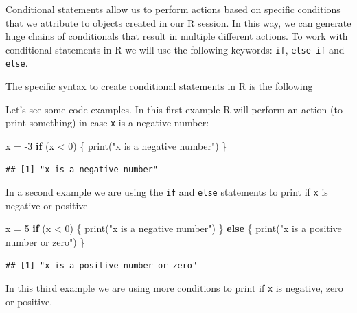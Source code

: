 \documentclass[
]{book}
\newenvironment{Shaded}{\begin{snugshade}}{\end{snugshade}}
\newcommand{\ControlFlowTok}[1]{\textcolor[rgb]{0.13,0.29,0.53}{\textbf{#1}}}
\newcommand{\DecValTok}[1]{\textcolor[rgb]{0.00,0.00,0.81}{#1}}
\newcommand{\FunctionTok}[1]{\textcolor[rgb]{0.00,0.00,0.00}{#1}}
\newcommand{\NormalTok}[1]{#1}
\newcommand{\OtherTok}[1]{\textcolor[rgb]{0.56,0.35,0.01}{#1}}
\newcommand{\SpecialCharTok}[1]{\textcolor[rgb]{0.00,0.00,0.00}{#1}}
\newcommand{\StringTok}[1]{\textcolor[rgb]{0.31,0.60,0.02}{#1}}
\theoremstyle{definition}
\theoremstyle{definition}
\theoremstyle{definition}
\theoremstyle{definition}
\theoremstyle{remark}
\begin{document}
Conditional statements allow us to perform actions based on specific conditions that we attribute to objects created in our R session. In this way, we can generate huge chains of conditionals that result in multiple different actions. To work with conditional statements in R we will use the following keywords: \texttt{if}, \texttt{else\ if} and \texttt{else}.

The specific syntax to create conditional statements in R is the following

Let's see some code examples. In this first example R will perform an action (to print something) in case \texttt{x} is a negative number:

\begin{Shaded}
\begin{Highlighting}[]
\NormalTok{x }\OtherTok{=} \SpecialCharTok{{-}}\DecValTok{3}
\ControlFlowTok{if}\NormalTok{ (x }\SpecialCharTok{\textless{}} \DecValTok{0}\NormalTok{) \{}
  \FunctionTok{print}\NormalTok{(}\StringTok{"x is a negative number"}\NormalTok{)}
\NormalTok{\}}
\end{Highlighting}
\end{Shaded}

\begin{verbatim}
## [1] "x is a negative number"
\end{verbatim}

In a second example we are using the \texttt{if} and \texttt{else} statements to print if \texttt{x} is negative or positive

\begin{Shaded}
\begin{Highlighting}[]
\NormalTok{x }\OtherTok{=} \DecValTok{5}
\ControlFlowTok{if}\NormalTok{ (x }\SpecialCharTok{\textless{}} \DecValTok{0}\NormalTok{) \{}
  \FunctionTok{print}\NormalTok{(}\StringTok{"x is a negative number"}\NormalTok{)}
\NormalTok{\} }\ControlFlowTok{else}\NormalTok{ \{}
  \FunctionTok{print}\NormalTok{(}\StringTok{"x is a positive number or zero"}\NormalTok{)}
\NormalTok{\}}
\end{Highlighting}
\end{Shaded}

\begin{verbatim}
## [1] "x is a positive number or zero"
\end{verbatim}

In this third example we are using more conditions to print if \texttt{x} is negative, zero or positive.
\end{document}
